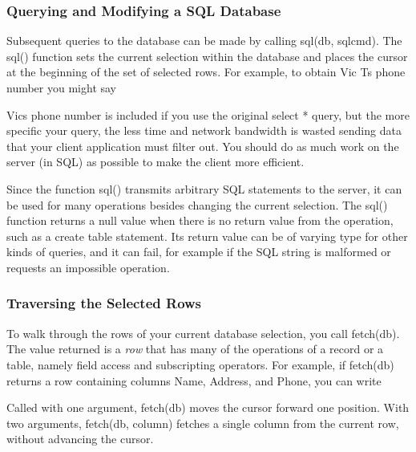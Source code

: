 \subsubsection{Querying and Modifying a SQL Database}

Subsequent queries to the database can be made by calling
\textsf{sql(db, sqlcmd)}. The \textsf{sql()} function sets
the current selection within the database and places the cursor at the
beginning of the set of selected rows. For example, to obtain Vic
T{\textquotesingle}s phone number you might say


Vic{\textquotesingle}s phone number is included if you use the original
\textsf{select *} query, but the more specific your query, the less
time and network bandwidth is wasted sending data that your client
application must filter out. You should do as much work on the server
(in SQL) as possible to make the client more efficient.

Since the function \textsf{sql()} transmits arbitrary SQL statements to
the server, it can be used for many operations besides changing the
current selection. The \textsf{sql()} function returns a null value
when there is no return value from the operation, such as a
\textsf{create table} statement. Its return value can be of varying
type for other kinds of queries, and it can fail, for example if the
SQL string is malformed or requests an impossible operation.

\subsubsection{Traversing the Selected Rows}

To walk through the rows of your current database selection, you call
\textsf{fetch(db)}. The value returned is a
\textit{row} that has many of the operations of a record or a table,
namely field access and subscripting operators. For example, if
\textsf{fetch(db)} returns a row containing columns Name, Address, and
Phone, you can write


Called with one argument, \textsf{fetch(db)} moves the cursor forward
one position. With two arguments, \textsf{fetch(db, column)} fetches a
single column from the current row, without advancing the cursor.

